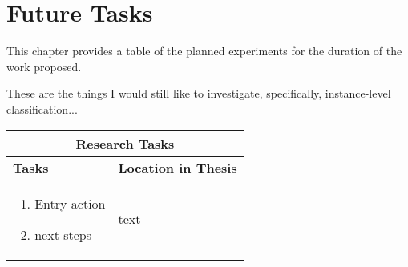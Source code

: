 \chapter{Future Tasks}
This chapter provides a table of the planned experiments for the duration of the work proposed.

These are the things I would still like to investigate, specifically, instance-level classification...

\begin{table}[H]
	\caption[List of Research Tasks]{List of research tasks and their corresponding locations in the dissertation document.}
	\label{tab:future_tasks}
	\begin{longtable}{ |p{8cm}|p{6cm}|  } 
		\hline
		\multicolumn{2}{|c|}{\textbf{Research Tasks}} \\
		\hline
		\hline
		\textbf{Tasks} & \textbf{Location in Thesis} \\
		\hline
		\begin{enumerate}
			\item Entry action
			\item next steps
		\end{enumerate} & text\\
		\hline
	\end{longtable}
\end{table}
